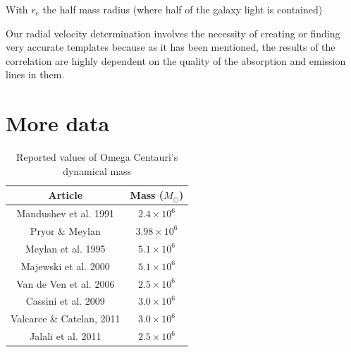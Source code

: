 With $r_{e}$ the half mass radius (where half of the galaxy light is contained)

Our radial velocity determination involves the necessity of creating or finding very accurate templates because as it has been mentioned, the results of the correlation are highly dependent on the quality of the absorption and emission lines in them.   


\section{More data}



\begin{table}[H]
\begin{center}
\begin{tabular}{| c | c| }
    \hline
    \textbf{Article} & \textbf{Mass} ($M_{\odot}$) \\ \hline
    Mandushev et al. 1991 & $2.4 \times 10^{6}$  \\ \hline
    Pryor \& Meylan & $3.98 \times 10^{6}$  \\ \hline
    Meylan et al. 1995 & $5.1 \times 10^{6}$  \\ \hline
    Majewski et al. 2000 & $5.1 \times 10^{6}$  \\ \hline
    Van de Ven et al. 2006 & $2.5 \times 10^{6}$  \\ \hline
    Cassini et al. 2009 & $3.0 \times 10^{6}$  \\ \hline
    Valcarce \& Catelan, 2011 & $3.0 \times 10^{6}$  \\ \hline
    Jalali et al. 2011 & $2.5 \times 10^{6}$  \\
    \hline
  \end{tabular} 
\caption[Mass Omega Centauri]{Reported values of Omega Centauri's dynamical mass}
\end{center}
\end{table}